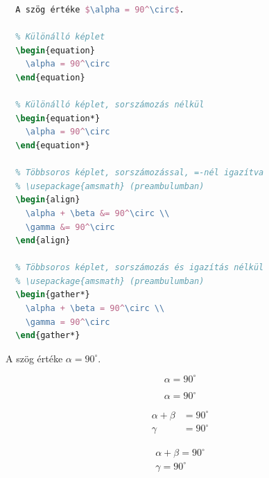 \begin{minipage}[t]{.6\textwidth}
	\begin{lstlisting}[language=tex,caption={Matematikai képletek}]
  % Szövegbe ágyazott képlet
  A szög értéke $\alpha = 90^\circ$.

  % Különálló képlet
  \begin{equation}
    \alpha = 90^\circ
  \end{equation}

  % Különálló képlet, sorszámozás nélkül
  \begin{equation*}
    \alpha = 90^\circ
  \end{equation*}

  % Többsoros képlet, sorszámozással, =-nél igazítva
  % \usepackage{amsmath} (preambulumban)
  \begin{align}
    \alpha + \beta &= 90^\circ \\
    \gamma &= 90^\circ
  \end{align}

  % Többsoros képlet, sorszámozás és igazítás nélkül
  % \usepackage{amsmath} (preambulumban)
  \begin{gather*}
    \alpha + \beta = 90^\circ \\
    \gamma = 90^\circ
  \end{gather*}
\end{lstlisting}
\end{minipage}\hfill
\begin{minipage}[t]{.35\textwidth}
	\vspace{18pt}
	\phantom{alma} A szög értéke $\alpha = 90^\circ$.

	\vspace{15pt}
	\begin{equation}
		\alpha = 90^\circ
	\end{equation}

	\vspace{10pt}
	\begin{equation*}
		\alpha = 90^\circ
	\end{equation*}

	\vspace{10pt}
	\begin{align}
		\alpha + \beta & = 90^\circ \\
		\gamma         & = 90^\circ
	\end{align}

	\vspace{-10pt}
	\begin{gather*}
		\alpha + \beta = 90^\circ \\
		\gamma = 90^\circ
	\end{gather*}
\end{minipage}

